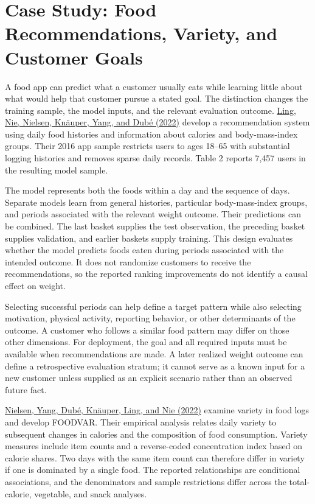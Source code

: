 \hypertarget{M07-case-study-food-recommendations-variety-and-customer-goals}{%
\section{Case Study: Food Recommendations, Variety, and Customer
Goals}\label{M07-case-study-food-recommendations-variety-and-customer-goals}}

\noindent A food app can predict what a customer usually eats while learning
little about what would help that customer pursue a stated goal. The
distinction changes the training sample, the model inputs, and the
relevant evaluation outcome.
\href{https://doi.org/10.1145/3485447.3514193}{Ling, Nie, Nielsen,
Knäuper, Yang, and Dubé (2022)} develop a recommendation system using
daily food histories and information about calories and body-mass-index
groups. Their 2016 app sample restricts users to ages 18--65 with
substantial logging histories and removes sparse daily records. Table 2
reports 7,457 users in the resulting model sample.

The model represents both the foods within a day and the sequence of
days. Separate models learn from general histories, particular
body-mass-index groups, and periods associated with the relevant weight
outcome. Their predictions can be combined. The last basket supplies the
test observation, the preceding basket supplies validation, and earlier
baskets supply training. This design evaluates whether the model
predicts foods eaten during periods associated with the intended
outcome. It does not randomize customers to receive the recommendations,
so the reported ranking improvements do not identify a causal effect on
weight.

Selecting successful periods can help define a target pattern while also
selecting motivation, physical activity, reporting behavior, or other
determinants of the outcome. A customer who follows a similar food
pattern may differ on those other dimensions. For deployment, the goal
and all required inputs must be available when recommendations are made.
A later realized weight outcome can define a retrospective evaluation
stratum; it cannot serve as a known input for a new customer unless
supplied as an explicit scenario rather than an observed future fact.

\href{https://doi.org/10.1086/720453}{Nielsen, Yang, Dubé, Knäuper,
Ling, and Nie (2022)} examine variety in food logs and develop FOODVAR.
Their empirical analysis relates daily variety to subsequent changes in
calories and the composition of food consumption. Variety measures
include item counts and a reverse-coded concentration index based on
calorie shares. Two days with the same item count can therefore differ
in variety if one is dominated by a single food. The reported
relationships are conditional associations, and the denominators and
sample restrictions differ across the total-calorie, vegetable, and
snack analyses.

